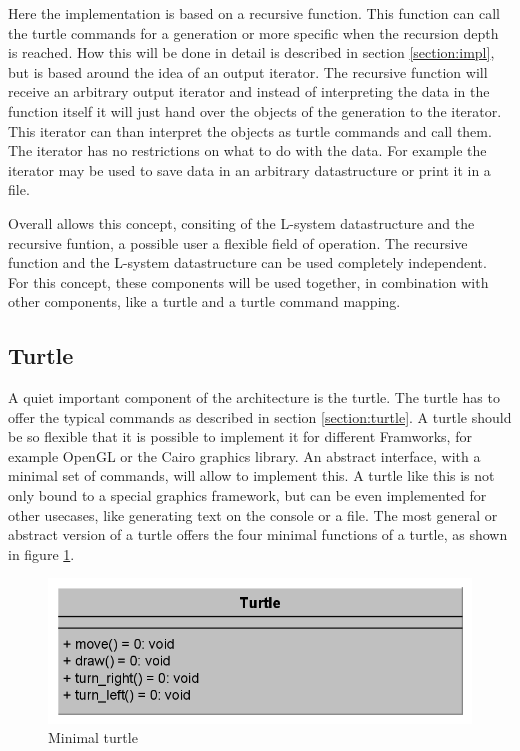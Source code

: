 \documentclass[english]{cpp-hmwk}
\begin{document}
Here the implementation is based on a recursive function. This function can call the turtle commands for a generation or more specific when the recursion depth is reached. How this will be done in detail is described in section \ref{section:impl}, but is based around the idea of an output iterator. The recursive function will receive an arbitrary output iterator and instead of interpreting the data in the function itself it will just hand over the objects of the generation to the iterator. This iterator can than interpret the objects as turtle commands and call them. The iterator has no restrictions on what to do with the data. For example the iterator may be used to save data in an arbitrary datastructure or print it in a file.

Overall allows this concept, consiting of the L-system datastructure and the recursive funtion, a possible user a flexible field of operation. The recursive function and the L-system datastructure can be used completely independent. For this concept, these components will be used together, in combination with other components, like a turtle and a turtle command mapping.

\subsection{Turtle}
A quiet important component of the architecture is the turtle. The turtle has to offer the typical commands as described in section \ref{section:turtle}. A turtle should be so flexible that it is possible to implement it for different Framworks, for example OpenGL or the Cairo graphics library. An abstract interface, with a minimal set of commands, will allow to implement this. A turtle like this is not only bound to a special graphics framework, but can be even implemented for other usecases, like generating text on the console or a file.
The most general or abstract version of a turtle offers the four minimal functions of a turtle, as shown in figure \ref{figure:minimal_turtle}.

\begin{figure}[h!]
	\centering
	\includegraphics[width=0.6\columnwidth]{../graphs/LSystem/examples/class_simple_turtle.png}
	\caption{Minimal turtle}
	\label{figure:minimal_turtle}
\end{figure}
\end{document}
